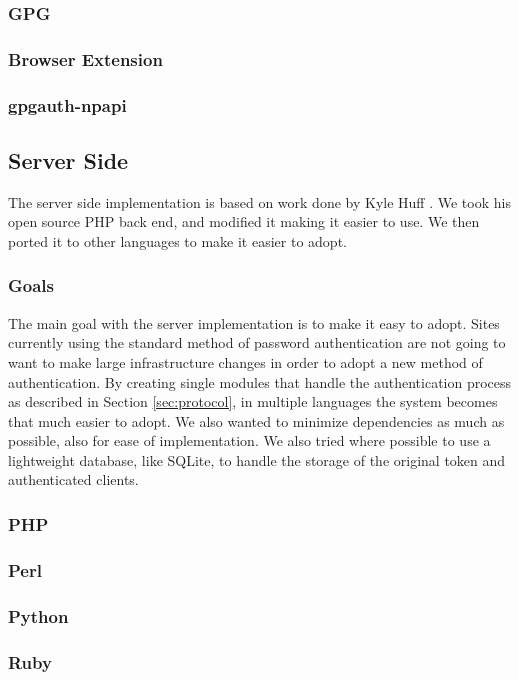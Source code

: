\documentclass[11pt]{article}
\begin{document}
\subsubsection{GPG}
\subsubsection{Browser Extension}
\subsubsection{gpgauth-npapi}

\subsection{Server Side}
The server side implementation is based on work done by Kyle Huff \cite{gpgauth}. We took his open source PHP back end, and modified it making it easier to use. We then ported it to other languages to make it easier to adopt.
\subsubsection{Goals}
The main goal with the server implementation is to make it easy to adopt. Sites currently using the standard method of password authentication are not going to want to make large infrastructure changes in order to adopt a new method of authentication. By creating single modules that handle the authentication process as described in Section \ref{sec:protocol}, in multiple languages the system becomes that much easier to adopt. We also wanted to minimize dependencies as much as possible, also for ease of implementation. We also tried where possible to use a lightweight database, like SQLite, to handle the storage of the original token and authenticated clients. 
\subsubsection{PHP}
\subsubsection{Perl}
\subsubsection{Python}
\subsubsection{Ruby}
\end{document}
